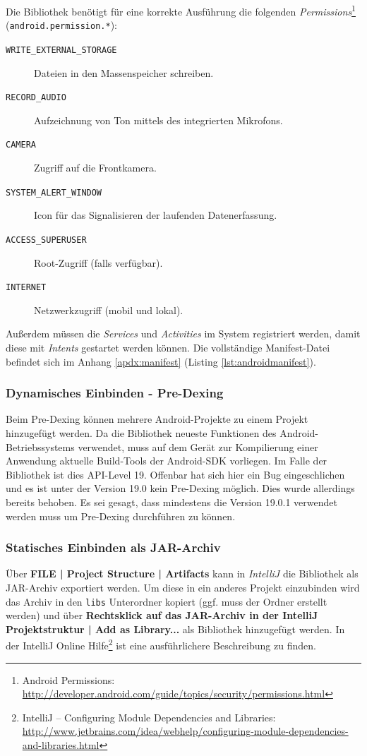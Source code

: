 Die Bibliothek benötigt für eine korrekte Ausführung die folgenden \emph{Permissions}\footnote{Android Permissions: \url{http://developer.android.com/guide/topics/security/permissions.html}} (\texttt{android.permission.*}):

\begin{description}
	\item[\texttt{WRITE\_EXTERNAL\_STORAGE}]
		Dateien in den Massenspeicher schreiben.
	\item[\texttt{RECORD\_AUDIO}]
		Aufzeichnung von Ton mittels des integrierten Mikrofons.
	\item[\texttt{CAMERA}]
		Zugriff auf die Frontkamera.
	\item[\texttt{SYSTEM\_ALERT\_WINDOW}]
		Icon für das Signalisieren der laufenden Datenerfassung.
	\item[\texttt{ACCESS\_SUPERUSER}]
		Root-Zugriff (falls verfügbar).
	\item[\texttt{INTERNET}]
		Netzwerkzugriff (mobil und lokal).
\end{description}

Außerdem müssen die \emph{Services} und \emph{Activities} im System registriert werden, damit diese mit \emph{Intents} gestartet werden können. Die vollständige Manifest-Datei befindet sich im Anhang \ref{apdx:manifest} (Listing \ref{lst:androidmanifest}).


\subsubsection{Dynamisches Einbinden - Pre-Dexing}
Beim Pre-Dexing können mehrere Android-Projekte zu einem Projekt hinzugefügt werden. 
Da die Bibliothek neueste Funktionen des Android-Betriebssystems verwendet, muss auf dem  Gerät zur Kompilierung einer Anwendung aktuelle Build-Tools der Android-SDK vorliegen.
Im Falle der Bibliothek ist dies API-Level 19. Offenbar hat sich hier ein Bug eingeschlichen und es ist unter der Version 19.0 kein Pre-Dexing möglich.
Dies wurde allerdings bereits behoben. Es sei gesagt, dass mindestens die Version 19.0.1 verwendet werden muss um Pre-Dexing durchführen zu können.


\subsubsection{Statisches Einbinden als JAR-Archiv}
Über \textbf{FILE | Project Structure | Artifacts} kann in \emph{IntelliJ} die Bibliothek als \ac{JAR}-Archiv exportiert werden.
Um diese in ein anderes Projekt einzubinden wird das Archiv in den \texttt{libs} Unterordner kopiert (ggf. muss der Ordner erstellt werden) und über \textbf{Rechtsklick auf das JAR-Archiv in der IntelliJ Projektstruktur | Add as Library...} als Bibliothek hinzugefügt werden.
In der IntelliJ Online Hilfe\footnote{IntelliJ -- Configuring Module Dependencies and Libraries:  \url{http://www.jetbrains.com/idea/webhelp/configuring-module-dependencies-and-libraries.html}} ist eine ausführlichere Beschreibung zu finden.

